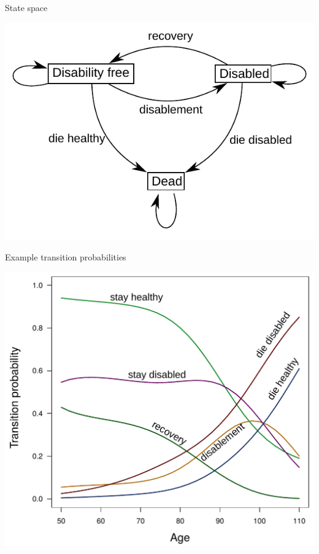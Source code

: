 \documentclass[20pt,usenames,dvipsnames]{beamer}
\begin{document}
\begin{frame}[plain]
\Large 
\begin{center}
State space \vspace{1em}

\includegraphics[scale=2]{StateSpace.pdf}
\end{center}
\end{frame}


\begin{frame}[plain]
\Large 
\begin{center}
Example transition probabilities \vspace{1em}

\includegraphics{TransitionsInk.pdf}
\end{center}
\end{frame}
\end{document}

